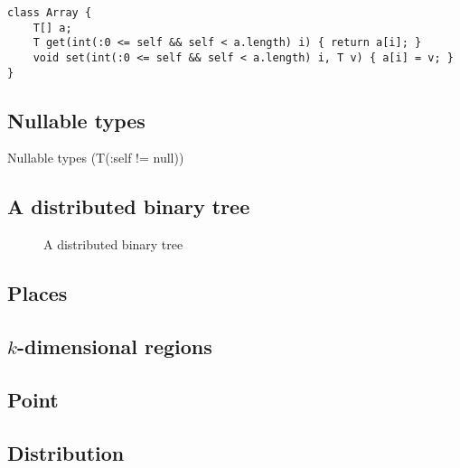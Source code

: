 \begin{verbatim}
class Array {
    T[] a;
    T get(int(:0 <= self && self < a.length) i) { return a[i]; }
    void set(int(:0 <= self && self < a.length) i, T v) { a[i] = v; }
}
\end{verbatim}

\subsection{Nullable types}

Nullable types (T(:self != null))


\subsection{A distributed binary tree}


\begin{figure*}

\caption{A distributed binary tree}
\label{fig:dist-tree}
\end{figure*}

\subsection{Places}

% 

\subsection{$k$-dimensional regions}

% 

\subsection{Point}


% 

\subsection{Distribution}


% 

